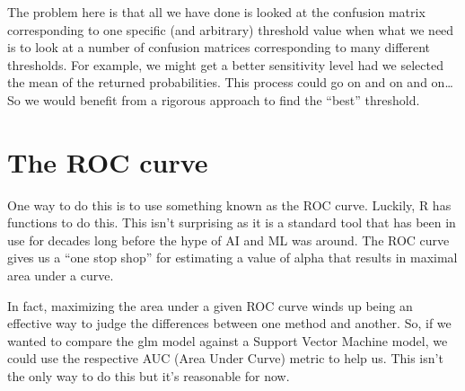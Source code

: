 \documentclass[]{book}
\newenvironment{Shaded}{\begin{snugshade}}{\end{snugshade}}
\newcommand{\KeywordTok}[1]{\textcolor[rgb]{0.13,0.29,0.53}{\textbf{#1}}}
\newcommand{\DataTypeTok}[1]{\textcolor[rgb]{0.13,0.29,0.53}{#1}}
\newcommand{\DecValTok}[1]{\textcolor[rgb]{0.00,0.00,0.81}{#1}}
\newcommand{\FloatTok}[1]{\textcolor[rgb]{0.00,0.00,0.81}{#1}}
\newcommand{\StringTok}[1]{\textcolor[rgb]{0.31,0.60,0.02}{#1}}
\newcommand{\OperatorTok}[1]{\textcolor[rgb]{0.81,0.36,0.00}{\textbf{#1}}}
\newcommand{\NormalTok}[1]{#1}
\begin{document}
The problem here is that all we have done is looked at the confusion
matrix corresponding to one specific (and arbitrary) threshold value
when what we need is to look at a number of confusion matrices
corresponding to many different thresholds. For example, we might get a
better sensitivity level had we selected the mean of the returned
probabilities. This process could go on and on and on\ldots{} So we
would benefit from a rigorous approach to find the ``best'' threshold.

\section{The ROC curve}\label{the-roc-curve}

One way to do this is to use something known as the ROC curve. Luckily,
R has functions to do this. This isn't surprising as it is a standard
tool that has been in use for decades long before the hype of AI and ML
was around. The ROC curve gives us a ``one stop shop'' for estimating a
value of alpha that results in maximal area under a curve.

In fact, maximizing the area under a given ROC curve winds up being an
effective way to judge the differences between one method and another.
So, if we wanted to compare the glm model against a Support Vector
Machine model, we could use the respective AUC (Area Under Curve) metric
to help us. This isn't the only way to do this but it's reasonable for
now.

\begin{Shaded}
\end{Shaded}
\end{document}
